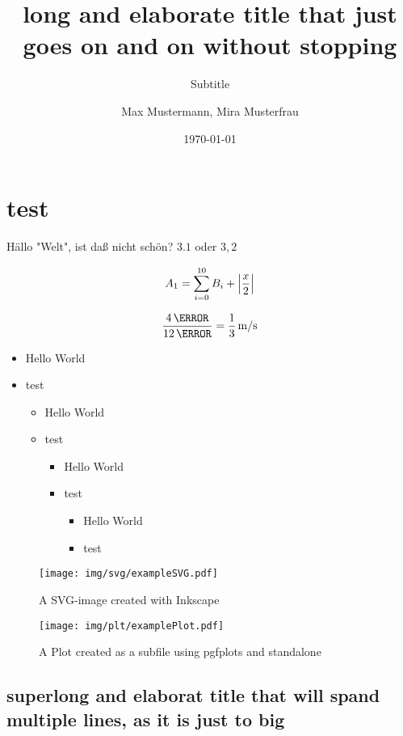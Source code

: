 \documentclass[todos=off]{HsH-report}
\author{
	Max Mustermann,
	Mira Musterfrau
}
\title{long and elaborate title that just goes on and on without stopping}
\subtitle{Subtitle}
\date{\today}
\begin{document}
	\frontmatter
	\maketitle

	\declarationofauthorship

	\begin{abstract}
		\lipsum[3-5]
	\end{abstract}

	\tableofcontents
	\mainmatter

	\chapter{test}

		Hällo "Welt", ist daß nicht schön? $3.1$ oder $3,2$

		\begin{equation}
			A_1 = \sum_{i=0}^{10} B_i + \left\vert\frac{x}{2}\right\vert
		\end{equation}

		\begin{equation}
			\frac{4\,\m}{12\,\s} = \frac{1}{3}\,\unit{m\per s}
		\end{equation}


		\begin{itemize}
			\item Hello World
			\item test
			\begin{itemize}
				\item Hello World
				\item test
				\begin{itemize}
					\item Hello World
					\item test
					\begin{itemize}
						\item Hello World
						\item test
					\end{itemize}
				\end{itemize}
			\end{itemize}
		\end{itemize}

		\begin{figure}
			\texttt{[image: img/svg/exampleSVG.pdf]}
			\caption{A SVG-image created with Inkscape}
		\end{figure}

		\begin{figure}
			\texttt{[image: img/plt/examplePlot.pdf]}
			\caption{A Plot created as a subfile using pgfplots and standalone}
		\end{figure}

	\section{superlong and elaborat title that will spand multiple lines, as it is just to big}
		\lipsum[12-13]
		\smallskip

		\lipsum[12-13]


		\lipsum[12-13]

	\listoffigures
	\listoftables
\end{document}
